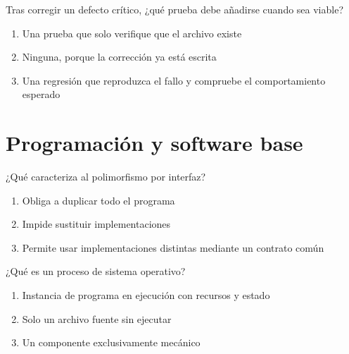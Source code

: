 \noindent\begin{minipage}{\linewidth}\setlength{\parskip}{4pt}\label{q:S-032}
Tras corregir un defecto crítico, ¿qué prueba debe añadirse cuando sea viable?
\begin{enumerate}[label=\Alph*),nosep]
\item Una prueba que solo verifique que el archivo existe
\item Ninguna, porque la corrección ya está escrita
\item Una regresión que reproduzca el fallo y compruebe el comportamiento esperado
\end{enumerate}\end{minipage}\par\medskip

\section{Programación y software base}

\noindent\begin{minipage}{\linewidth}\setlength{\parskip}{4pt}\label{q:S-033}
¿Qué caracteriza al polimorfismo por interfaz?
\begin{enumerate}[label=\Alph*),nosep]
\item Obliga a duplicar todo el programa
\item Impide sustituir implementaciones
\item Permite usar implementaciones distintas mediante un contrato común
\end{enumerate}\end{minipage}\par\medskip

\noindent\begin{minipage}{\linewidth}\setlength{\parskip}{4pt}\label{q:S-034}
¿Qué es un proceso de sistema operativo?
\begin{enumerate}[label=\Alph*),nosep]
\item Instancia de programa en ejecución con recursos y estado
\item Solo un archivo fuente sin ejecutar
\item Un componente exclusivamente mecánico
\end{enumerate}\end{minipage}\par\medskip


